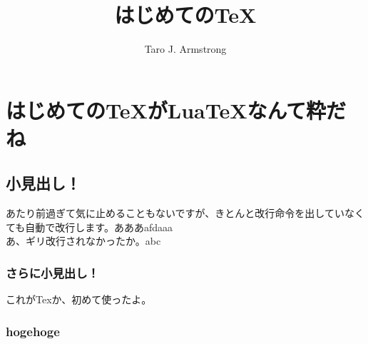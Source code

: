 \documentclass{ltjsarticle}
\begin{document}
\title{はじめての\TeX }
\author{Taro J. Armstrong}
\maketitle
\section{はじめての\TeX がLua\TeX なんて粋だね}

\subsection{小見出し！}
あたり前過ぎて気に止めることもないですが、きとんと改行命令を出していなくても自動で改行します。あああafdaaa
\\あ、ギリ改行されなかったか。abc


\subsubsection{さらに小見出し！}
これがTexか、初めて使ったよ。

\subsubsection{hogehoge}
\end{document}
